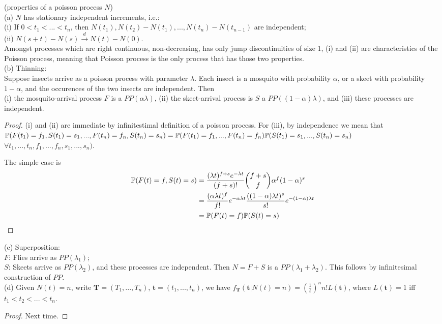 \documentclass[a4paper]{article}
\begin{document}
\begin{prop} (properties of a poisson process $N$)\\
(a) $N$ has stationary independent increments, i.e.:\\
(i) If $0<t_1<...<t_n$, then $N(t_1),N(t_2)-N(t_1),...,N(t_n)-N(t_{n-1})$ are independent;\\
(ii) $N(s+t)-N(s) \xrightarrow{d} N(t)-N(0)$.\\
Amongst processes which are right continuous, non-decreasing, has only jump discontinuities of size 1, (i) and (ii) are characteristics of the Poisson process, meaning that Poisson process is the only process that has those two properties.\\
(b) Thinning:\\
Suppose insects arrive as a poisson process with parameter $\lambda$. Each insect is a mosquito with probability $\alpha$, or a skeet with probability $1-\alpha$, and the occurences of the two insects are independent. Then\\
(i) the mosquito-arrival process $F$ is a $PP(\alpha\lambda)$, 
(ii) the skeet-arrival process is $S$ a $PP((1-\alpha)\lambda)$, and 
(iii) these processes are independent.
\begin{proof}
(i) and (ii) are immediate by infinitestimal definition of a poisson process. For (iii), by independence we mean that $\P(F(t_1)=f_1,S(t_1)=s_1,...,F(t_n)=f_n,S(t_n)=s_n) = \P(F(t_1)=f_1,...,F(t_n)=f_n) \P(S(t_1)=s_1,...,S(t_n)=s_n)$ $\forall t_1,...,t_n,f_1,...,f_n,s_1,...,s_n)$.

The simple case is 
\begin{equation*}
\begin{aligned}
\P(F(t) = f, S(t) = s) &= \frac{(\lambda t)^{f+s} e^{-\lambda t}}{(f+s)!}{{f+s} \choose f} \alpha^f (1-\alpha)^s\\
&= \frac{(\alpha\lambda t)^f}{f!} e^{-\alpha\lambda t} \frac{((1-\alpha) \lambda t)^s}{s!} e^{-(1-\alpha)\lambda t}\\
&= \P(F(t) = f) \P(S(t) = s)
\end{aligned}
\end{equation*}
\end{proof}
(c) Superposition:\\
$F$: Flies arrive as $PP(\lambda_1)$;\\
$S$: Skeets arrive as $PP(\lambda_2)$, and these processes are independent. Then $N=F+S$ is a $PP(\lambda_1+\lambda_2)$. This follows by infinitesimal construction of $PP$.\\
(d) Given $N(t) = n$, write $\mathbf{T} = (T_1,...,T_n)$, $\mathbf{t} = (t_1,...,t_n)$, we have $f_{\mathbf{T}}(\mathbf{t} | N(t) = n) =\left(\frac{1}{t}\right)^n n! L(\mathbf{t})$, where $L(\mathbf{t})=1$ iff $t_1<t_2<...<t_n$.
\begin{proof}
Next time.
\end{proof}
\end{prop}
\end{document}
